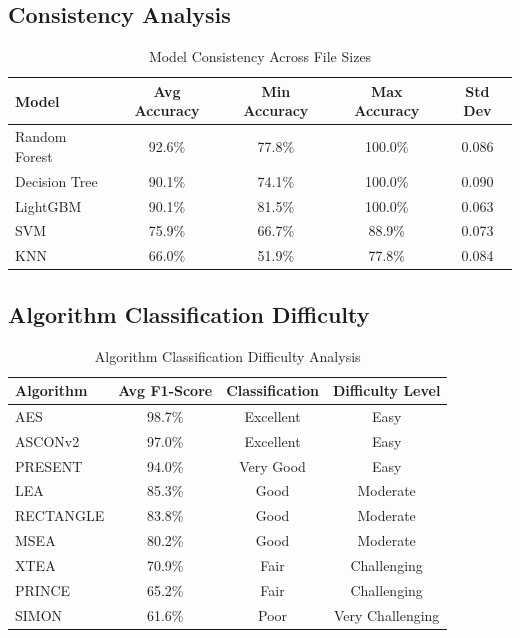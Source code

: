 \documentclass[12pt]{article}
\begin{document}
\subsection{Consistency Analysis}

\begin{table}[h!]
\centering
\caption{Model Consistency Across File Sizes}
\label{tab:consistency_analysis}
\begin{tabular}{|l|c|c|c|c|}
\hline
\textbf{Model} & \textbf{Avg Accuracy} & \textbf{Min Accuracy} & \textbf{Max Accuracy} & \textbf{Std Dev} \\
\hline
Random Forest & 92.6\% & 77.8\% & 100.0\% & 0.086 \\
\hline
Decision Tree & 90.1\% & 74.1\% & 100.0\% & 0.090 \\
\hline
LightGBM & 90.1\% & 81.5\% & 100.0\% & 0.063 \\
\hline
SVM & 75.9\% & 66.7\% & 88.9\% & 0.073 \\
\hline
KNN & 66.0\% & 51.9\% & 77.8\% & 0.084 \\
\hline
\end{tabular}
\end{table}

\subsection{Algorithm Classification Difficulty}

\begin{table}[h!]
\centering
\caption{Algorithm Classification Difficulty Analysis}
\label{tab:algorithm_difficulty}
\begin{tabular}{|l|c|c|c|}
\hline
\textbf{Algorithm} & \textbf{Avg F1-Score} & \textbf{Classification} & \textbf{Difficulty Level} \\
\hline
AES & 98.7\% & Excellent & Easy \\
\hline
ASCONv2 & 97.0\% & Excellent & Easy \\
\hline
PRESENT & 94.0\% & Very Good & Easy \\
\hline
LEA & 85.3\% & Good & Moderate \\
\hline
RECTANGLE & 83.8\% & Good & Moderate \\
\hline
MSEA & 80.2\% & Good & Moderate \\
\hline
XTEA & 70.9\% & Fair & Challenging \\
\hline
PRINCE & 65.2\% & Fair & Challenging \\
\hline
SIMON & 61.6\% & Poor & Very Challenging \\
\hline
\end{tabular}
\end{table}
\end{document}
